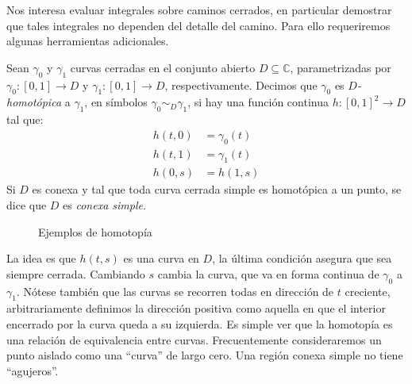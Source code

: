   Nos interesa evaluar integrales sobre caminos cerrados,
  en particular demostrar que tales integrales
  no dependen del detalle del camino.
  Para ello requeriremos algunas herramientas adicionales.
  \begin{definition}
    Sean \(\gamma_0\) y \(\gamma_1\) curvas cerradas
    en el conjunto abierto \(D \subseteq \mathbb{C}\),
    parametrizadas por \(\gamma_0 \colon [0, 1] \rightarrow D\)
    y \(\gamma_1 \colon [0, 1] \rightarrow D\),
    respectivamente.
    Decimos que \(\gamma_0\)
    es \emph{\(D\)-homotópica} a \(\gamma_1\),
    en símbolos \(\gamma_0 \sim_D \gamma_1\),
    si hay una función continua \(h \colon [0, 1]^2 \rightarrow D\)
    tal que:
    \begin{align*}
      h(t, 0)
	&= \gamma_0(t) \\
      h(t, 1)
	&= \gamma_1(t) \\
      h(0, s)
	&= h(1, s)
    \end{align*}
    Si \(D\) es conexa
    y tal que toda curva cerrada simple es homotópica
    a un punto,
    se dice que \(D\) es \emph{conexa simple}.%
  \end{definition}
  \begin{figure}[ht]
    \centering
    \caption{Ejemplos de homotopía}
    \label{fig:homotopy}
  \end{figure}
  La idea es que \(h(t, s)\) es una curva en \(D\),
  la última condición asegura que sea siempre cerrada.
  Cambiando \(s\) cambia la curva,
  que va en forma continua de \(\gamma_0\) a \(\gamma_1\).
  Nótese también que las curvas se recorren todas
  en dirección de \(t\) creciente,
  arbitrariamente definimos la dirección positiva
  como aquella en que el interior encerrado por la curva
  queda a su izquierda.
  Es simple ver que la homotopía
  es una relación de equivalencia entre curvas.
  Frecuentemente consideraremos un punto aislado como una ``curva''
  de largo cero.
  Una región conexa simple no tiene ``agujeros''.

